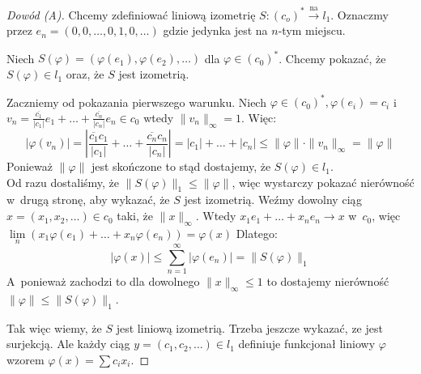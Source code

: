 \documentclass[11pt]{mwrep}
\renewcommand{\[}{\begin{equation}}
\renewcommand{\]}{\end{equation}}
\begin{document}
\begin{proof}[Dowód (A)]
  Chcemy zdefiniować liniową izometrię $S\colon (c_o)^* \overset{\textrm{na}}{\longrightarrow} l_1$.
	Oznaczmy przez $e_n = (0,0,\ldots,0,1,0,\ldots)$ gdzie jedynka jest na $n$-tym miejscu.\par

	Niech $S(\varphi) = \left( \varphi(e_1), \varphi(e_2),\ldots \right)$ dla $\varphi\in (c_0)^*$. 
	Chcemy pokazać, że $S(\varphi)\in l_1$ oraz, że $S$ jest izometrią. \par
	Zaczniemy od pokazania pierwszego warunku.
	Niech $\varphi\in (c_0)^*, \varphi(e_i) = c_i$ i~ $v_n = \frac{\overline{c_1}}{|c_1|}e_1 + \ldots+ \frac{\overline{c_n}}{|c_n|}e_n \in c_0$ wtedy $\|v_n\|_\infty=1$. Więc:
	$$|\varphi(v_n)| = \left| \frac{\overline{c_1} c_1}{|c_1|}+\ldots+\frac{\overline{c_n} c_n}{|c_n|} \right|= |c_1| +\ldots + |c_n| \le \|\varphi\|\cdot \|v_n\|_\infty = \|\varphi\|$$
	Ponieważ $\|\varphi\|$ jest skończone to stąd dostajemy, że $S(\varphi) \in l_1$.\\
	
	Od razu dostaliśmy, że $\|S(\varphi)\|_1 \le \|\varphi\|$, więc wystarczy pokazać  nierówność w~drugą stronę, aby wykazać, że $S$ jest izometrią.
	Weźmy dowolny ciąg $x=(x_1,x_2,\ldots)\in c_0$ taki, że $\|x\|_\infty$. Wtedy $x_1e_1+\ldots+ x_n e_n  \to x$ w~$c_0$, więc $\lim\limits_n( x_1\varphi(e_1)+ \ldots +x_n\varphi(e_n)) = \varphi(x)$
	Dlatego:
	$$|\varphi(x)|\le \sum_{n=1}^\infty |\varphi(e_n)| =\|S(\varphi)\|_1$$
	A~ponieważ zachodzi to dla dowolnego $\|x\|_\infty \le 1$ to dostajemy nierówność $\|\varphi\| \le \|S(\varphi)\|_1$.
	
	Tak więc wiemy, że $S$ jest liniową izometrią. Trzeba jeszcze wykazać, ze jest surjekcją. Ale każdy ciąg $y= (c_1,c_2,\ldots)\in l_1$ definiuje funkcjonał liniowy $\varphi$ wzorem
	$\varphi(x) = \sum c_i x_i$. 



\end{proof}
\end{document}
